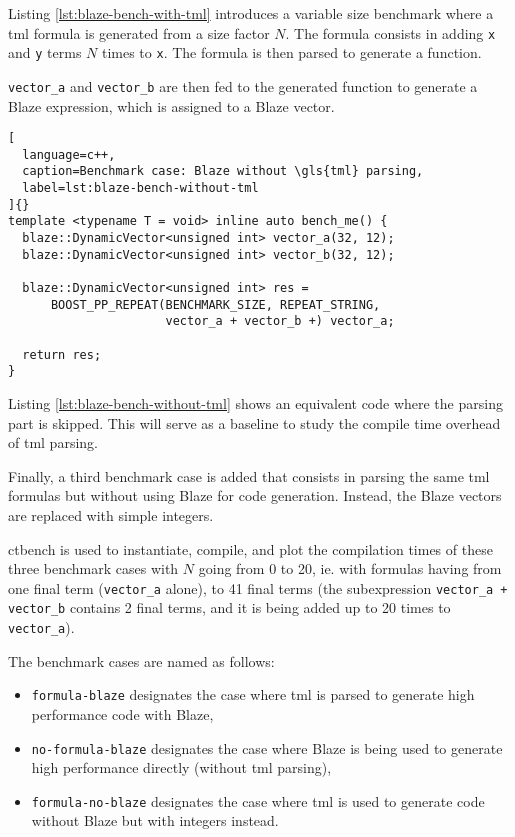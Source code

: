 \documentclass[../main]{subfiles}
\begin{document}
Listing \ref{lst:blaze-bench-with-tml} introduces a variable size benchmark
where a \gls{tml} formula is generated from a size factor $N$.
The formula consists in adding \lstinline{x} and \lstinline{y} terms $N$ times
to \lstinline{x}. The formula is then parsed to generate a \cpp function.

\lstinline{vector_a} and \lstinline{vector_b} are then fed to the generated
function to generate a Blaze expression, which is assigned to a Blaze vector.

\begin{lstlisting}[
  language=c++,
  caption=Benchmark case: Blaze without \gls{tml} parsing,
  label=lst:blaze-bench-without-tml
]{}
template <typename T = void> inline auto bench_me() {
  blaze::DynamicVector<unsigned int> vector_a(32, 12);
  blaze::DynamicVector<unsigned int> vector_b(32, 12);

  blaze::DynamicVector<unsigned int> res =
      BOOST_PP_REPEAT(BENCHMARK_SIZE, REPEAT_STRING,
                      vector_a + vector_b +) vector_a;

  return res;
}
\end{lstlisting}

Listing \ref{lst:blaze-bench-without-tml} shows an equivalent code
where the parsing part is skipped. This will serve as a baseline to study
the compile time overhead of \gls{tml} parsing.

Finally, a third benchmark case is added that consists in parsing
the same \gls{tml} formulas but without using Blaze for code generation.
Instead, the Blaze vectors are replaced with simple integers.

ctbench is used to instantiate, compile, and plot the compilation times
of these three benchmark cases with $N$ going from 0 to 20, ie. with formulas
having from one final term (\lstinline{vector_a} alone), to 41 final terms
(the subexpression \lstinline{vector_a + vector_b} contains 2 final terms,
and it is being added up to 20 times to \lstinline{vector_a}).

The benchmark cases are named as follows:

\begin{itemize}
\item \lstinline{formula-blaze} designates the case where \gls{tml} is parsed
to generate high performance code with Blaze,
\item \lstinline{no-formula-blaze} designates the case where Blaze is being used
to generate high performance directly (\ie without \gls{tml} parsing),
\item \lstinline{formula-no-blaze} designates the case where \gls{tml} is used
to generate code without Blaze but with integers instead.
\end{itemize}
\end{document}

